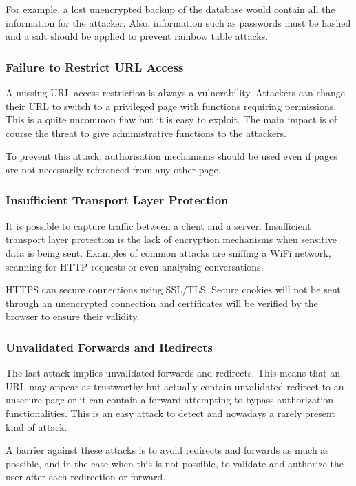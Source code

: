For example, a lost unencrypted backup of the database would contain all the
information for the attacker.
Also, information such as passwords must be hashed and a salt should be
applied to prevent rainbow table attacks.

\subsubsection{Failure to Restrict URL Access}

A missing URL access restriction is always a vulnerability.
Attackers can change their URL to switch to a privileged page with functions
requiring permissions.
This is a quite uncommon flaw but it is easy to exploit. The main impact is of
course the threat to give administrative functions to the attackers.

To prevent this attack, authorisation mechanisms should be used even if
pages are not necessarily referenced from any other page.

\subsubsection{Insufficient Transport Layer Protection}

It is possible to capture traffic between a client and a server.
Insufficient transport layer protection is the lack of encryption mechanisms
when sensitive data is being sent.
Examples of common attacks are sniffing a WiFi network, scanning for HTTP
requests or even analysing conversations.

HTTPS can secure connections using SSL/TLS. Secure cookies will not be sent
through an unencrypted connection and certificates will be verified by the
browser to ensure their validity.

\subsubsection{Unvalidated Forwards and Redirects}

The last attack implies unvalidated forwards and redirects. This means that an
URL may appear as trustworthy but actually contain unvalidated redirect to an
unsecure page or it can contain a forward attempting to bypass authorization
functionalities. This is an easy attack to detect and nowadays a rarely
present kind of attack.

A barrier against these attacks is to avoid redirects and forwards as much as
possible, and in the case when this is not possible, to validate and authorize
the user after each redirection or forward.

